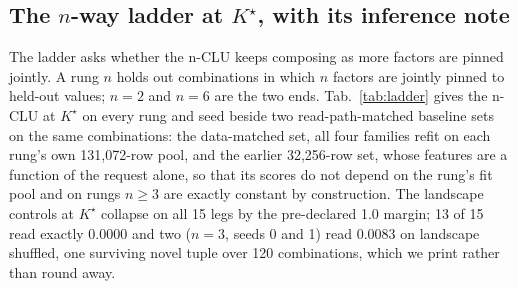 \documentclass{article} %
\newcommand{\Kstar}{\ensuremath{K^{\star}}}
\begin{document}
\subsection{The $n$-way ladder at $\Kstar$, with its inference note}
\label{sec:ladder}

The ladder asks whether the n-CLU keeps composing as more factors are pinned jointly. A rung
$n$ holds out combinations in which $n$ factors are jointly pinned to held-out values; $n=2$ and
$n=6$ are the two ends. Tab.~\ref{tab:ladder} gives the n-CLU at $\Kstar$ on every rung and
seed beside two read-path-matched baseline sets on the same combinations: the data-matched set, all four
families refit on each rung's own 131,072-row pool, and the earlier 32,256-row set, whose features %
are a function of the request alone, so that its scores do not depend on the rung's fit pool and on
rungs $n\ge3$ are exactly constant by construction. %
The landscape controls at $\Kstar$ collapse on all 15 legs by the pre-declared 1.0 margin;
13 of 15 read exactly 0.0000 and two ($n=3$, seeds 0 and 1) read 0.0083 on
landscape shuffled, one surviving novel tuple over 120 combinations, which we print
rather than round away. %
\end{document}
